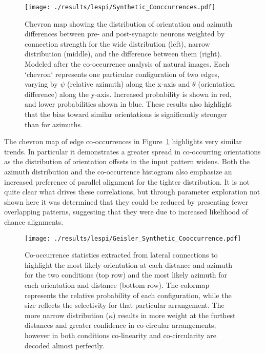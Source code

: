 \begin{figure}
	\centering
        \texttt{[image: ./results/lespi/Synthetic\_Cooccurrences.pdf]}
	\caption[Chevron map showing the distribution of orientation and
      azimuth differences between pre- and post-synaptic
      neurons.]{Chevron map showing the distribution of orientation
      and azimuth differences between pre- and post-synaptic neurons
      weighted by connection strength for the wide distribution
      (left), narrow distribution (middle), and the difference between
      them (right). Modeled after the \cite{Perrinet2015}
      co-occurrence analysis of natural images. Each `chevron`
      represents one particular configuration of two edges, varying by
      $\psi$ (relative azimuth) along the x-axis and $\theta$
      (orientation difference) along the y-axis. Increased probability
      is shown in red, and lower probabilities shown in blue. These
      results also highlight that the bias toward similar orientations
      is significantly stronger than for azimuths.}
	\label{SyntheticCooccurrence}
\end{figure}

The chevron map of edge co-occurrences in
Figure~\ref{SyntheticCooccurrence} highlights very similar trends. In
particular it demonstrates a greater spread in co-occurring
orientations as the distribution of orientation offsets in the input
pattern widens. Both the azimuth distribution and the co-occurrence
histogram also emphasize an increased preference of parallel alignment
for the tighter distribution. It is not quite clear what drives these
correlations, but through parameter exploration not shown here it was
determined that they could be reduced by presenting fewer overlapping
patterns, suggesting that they were due to increased likelihood of
chance alignments.

\begin{figure}
	\centering
    \texttt{[image: ./results/lespi/Geisler\_Synthetic\_Cooccurrence.pdf]}
	\caption{Co-occurrence statistics extracted from lateral
      connections to highlight the most likely orientation at each
      distance and azimuth for the two conditions (top row) and the
      most likely azimuth for each orientation and distance (bottom
      row). The colormap represents the relative probability of each
      configuration, while the size reflects the selectivity for that
      particular arrangement. The more narrow distribution ($\kappa$)
      results in more weight at the furthest distances and greater
      confidence in co-circular arrangements, however in both
      conditions co-linearity and co-circularity are decoded almost
      perfectly. }
	\label{SyntheticGeisler}
\end{figure}


